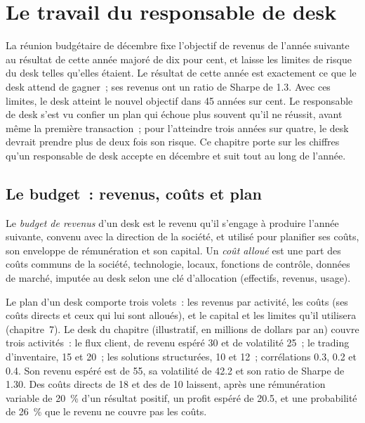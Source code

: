 \chapter{Le travail du responsable de desk}\label{ch:fm:the-head-of-desks-job}

La réunion budgétaire de décembre fixe l'objectif de revenus de l'année suivante au résultat de cette année majoré de dix pour cent, et laisse les limites de risque du desk
telles qu'elles étaient. Le résultat de cette année est exactement ce que le desk attend de gagner~; ses revenus ont un ratio de Sharpe de 1.3. Avec ces limites, le desk
atteint le nouvel objectif dans 45 années sur cent. Le responsable de desk s'est vu confier un plan qui échoue plus souvent qu'il ne réussit, avant même la première transaction~;
pour l'atteindre trois années sur quatre, le desk devrait prendre plus de deux fois son risque. Ce chapitre porte sur les chiffres qu'un responsable de desk accepte en décembre
et suit tout au long de l'année.

\section{Le budget~: revenus, coûts et plan}

\begin{definition}\label{def:fm:the-head-of-desks-job:budget}
Le \emph{budget de revenus} d'un desk est le revenu qu'il s'engage à produire l'année suivante, convenu avec la direction de la société,
et utilisé pour planifier ses coûts, son enveloppe de rémunération et son capital. Un \emph{coût alloué} est une part des coûts communs de la société,
technologie, locaux, fonctions de contrôle, données de marché, imputée au desk selon une clé d'allocation (effectifs, revenus, usage).
\end{definition}

Le plan d'un desk comporte trois volets~: les revenus par activité, les coûts (ses coûts directs et ceux qui lui sont alloués), et le capital et les limites qu'il utilisera (chapitre~7).
Le desk du chapitre (illustratif, en millions de dollars par an) couvre trois activités~: le flux client, de revenu espéré 30 et de volatilité 25~;
le trading d'inventaire, 15 et 20~; les solutions structurées, 10 et 12~; corrélations 0.3, 0.2 et 0.4. Son revenu espéré est de 55, sa volatilité de 42.2
et son ratio de Sharpe de 1.30. Des coûts directs de 18 et des  de 10 laissent, après une rémunération variable de 20~\% d'un résultat positif, un
profit espéré de 20.5, et une probabilité de 26~\% que le revenu ne couvre pas les coûts.

